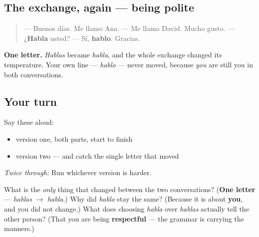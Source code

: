 \subsection*{The exchange, again — being polite}
\begin{quote}
— Buenos días. Me llamo Ana. — Me llamo David. Mucho gusto. — ¿\textbf{Habla} usted? — Sí, \textbf{hablo}. Gracias.
\end{quote}

\textbf{One letter.} \emph{Hablas} became \emph{habla}, and the whole exchange changed its temperature. Your own line — \emph{hablo} — never moved, because \emph{you} are still you in both conversations.

\subsection*{Your turn}
Say these aloud:

\begin{itemize}
\raggedright
  \item version one, both parts, start to finish
  \item version two — and catch the single letter that moved
\end{itemize}

\emph{Twice through:} Run whichever version is harder.

\begin{tcolorbox}[breakable,colback=teal!4,colframe=teal!35!black,title={Before you move on}]
What is the \emph{only} thing that changed between the two conversations? (\textbf{One letter} — \emph{hablas} $\to$ \emph{habla}.) Why did \emph{hablo} stay the same? (Because it is about \textbf{you}, and you did not change.) What does choosing \emph{habla} over \emph{hablas} actually tell the other person? (That you are being \textbf{respectful} — the grammar is carrying the manners.)
\end{tcolorbox}
